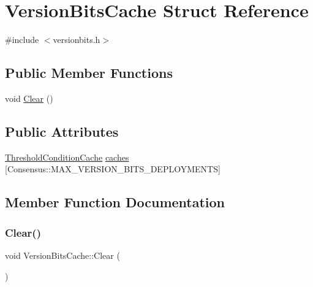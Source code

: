 \hypertarget{struct_version_bits_cache}{}\section{Version\+Bits\+Cache Struct Reference}
\label{struct_version_bits_cache}


{\ttfamily \#include $<$versionbits.\+h$>$}

\subsection*{Public Member Functions}
\begin{DoxyCompactItemize}
\item 
void \mbox{\hyperlink{struct_version_bits_cache_ab94b6d7a6d393ddcdb0498a6fe517733}{Clear}} ()
\end{DoxyCompactItemize}
\subsection*{Public Attributes}
\begin{DoxyCompactItemize}
\item 
\mbox{\hyperlink{versionbits_8h_a06fae3f599b3fadc0ea127cd55c111ab}{Threshold\+Condition\+Cache}} \mbox{\hyperlink{struct_version_bits_cache_ad532fe8c1050df1b7396db8a80f7b472}{caches}} \mbox{[}Consensus\+::\+M\+A\+X\+\_\+\+V\+E\+R\+S\+I\+O\+N\+\_\+\+B\+I\+T\+S\+\_\+\+D\+E\+P\+L\+O\+Y\+M\+E\+N\+TS\mbox{]}
\end{DoxyCompactItemize}


\subsection{Member Function Documentation}
\mbox{\label{struct_version_bits_cache_ab94b6d7a6d393ddcdb0498a6fe517733}} 
\subsubsection{\texorpdfstring{Clear()}{Clear()}}
{\footnotesize\ttfamily void Version\+Bits\+Cache\+::\+Clear (\begin{DoxyParamCaption}{ }\end{DoxyParamCaption})}



